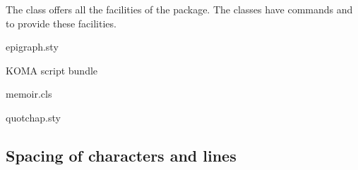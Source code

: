 The  class offers all the facilities of the
 package.  The  classes have
commands  and  to provide these
facilities.
\begin{ctanrefs}
\item[epigraph.sty]
\item[\nothtml{\rmfamily}KOMA script bundle]
\item[memoir.cls]
\item[quotchap.sty]
\end{ctanrefs}




\subsection{Spacing of characters and lines}

